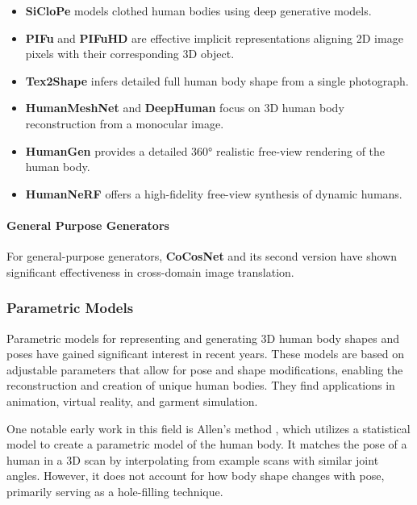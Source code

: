 \begin{itemize}
	\item \textbf{SiCloPe} \cite{DBLP:journals/corr/abs-1901-00049} models clothed human bodies using deep generative models.
	\item \textbf{PIFu} and \textbf{PIFuHD} \cite{pifu, pifuhd} are effective implicit representations aligning 2D image pixels with their corresponding 3D object.
	\item \textbf{Tex2Shape} \cite{alldieck2019tex2shape} infers detailed full human body shape from a single photograph.
	\item \textbf{HumanMeshNet} \cite{DBLP:journals/corr/abs-1908-06544} and \textbf{DeepHuman} \cite{DBLP:journals/corr/abs-1903-06473} focus on 3D human body reconstruction from a monocular image.
	\item \textbf{HumanGen} \cite{jiang2022humangen} provides a detailed 360° realistic free-view rendering of the human body.
	\item \textbf{HumanNeRF} \cite{weng_humannerf_2022_cvpr} offers a high-fidelity free-view synthesis of dynamic humans.
\end{itemize}

\paragraph{General Purpose Generators}

For general-purpose generators, \textbf{CoCosNet} and its second version
\cite{Zhang_2020_CVPR, Zhou_2021_CVPR} have shown significant effectiveness in
cross-domain image translation.

\subsubsection{Parametric Models}

Parametric models for representing and generating 3D human body shapes and
poses have gained significant interest in recent years. These models are based
on adjustable parameters that allow for pose and shape modifications, enabling
the reconstruction and creation of unique human bodies. They find applications
in animation, virtual reality, and garment simulation.

One notable early work in this field is Allen's method \cite{allen:2003}, which
utilizes a statistical model to create a parametric model of the human body. It
matches the pose of a human in a 3D scan by interpolating from example scans
with similar joint angles. However, it does not account for how body shape
changes with pose, primarily serving as a hole-filling technique.

